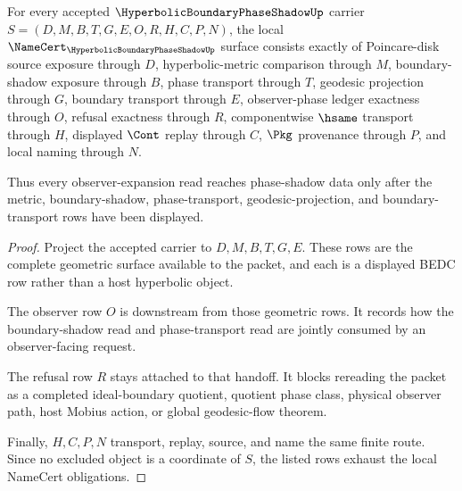 \begin{theorem}
\label{thm:hyperbolic-boundary-phase-shadow-namecert-obligations}
For every accepted $\HyperbolicBoundaryPhaseShadowUp$ carrier $S=(D,M,B,T,G,E,O,R,H,C,P,N)$, the local $\NameCert_{\HyperbolicBoundaryPhaseShadowUp}$ surface consists exactly of Poincare-disk source exposure through $D$, hyperbolic-metric comparison through $M$, boundary-shadow exposure through $B$, phase transport through $T$, geodesic projection through $G$, boundary transport through $E$, observer-phase ledger exactness through $O$, refusal exactness through $R$, componentwise $\hsame$ transport through $H$, displayed $\Cont$ replay through $C$, $\Pkg$ provenance through $P$, and local naming through $N$.

Thus every observer-expansion read reaches phase-shadow data only after the metric, boundary-shadow, phase-transport, geodesic-projection, and boundary-transport rows have been displayed.
\end{theorem}
\begin{proof}
Project the accepted carrier to $D,M,B,T,G,E$. These rows are the complete geometric surface available to the packet, and each is a displayed BEDC row rather than a host hyperbolic object.

The observer row $O$ is downstream from those geometric rows. It records how the boundary-shadow read and phase-transport read are jointly consumed by an observer-facing request.

The refusal row $R$ stays attached to that handoff. It blocks rereading the packet as a completed ideal-boundary quotient, quotient phase class, physical observer path, host Mobius action, or global geodesic-flow theorem.

Finally, $H,C,P,N$ transport, replay, source, and name the same finite route. Since no excluded object is a coordinate of $S$, the listed rows exhaust the local NameCert obligations.
\end{proof}



